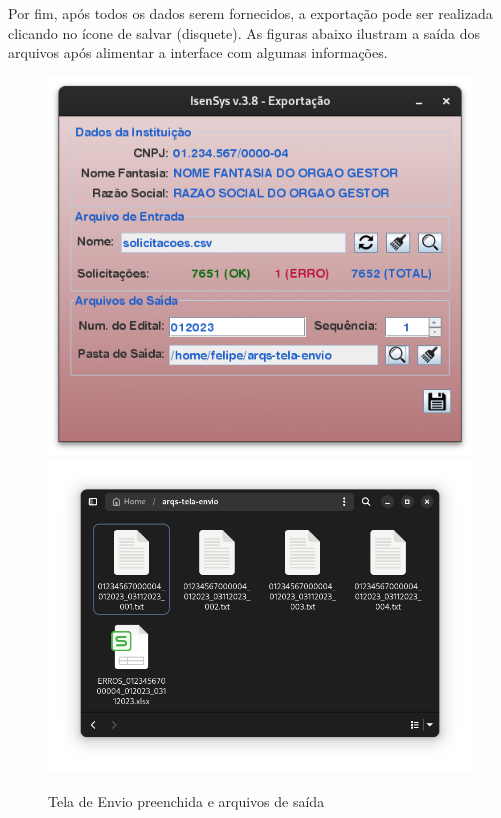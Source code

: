 \documentclass[
	12pt,			%
	openright,		%
	oneside,	
	a4paper,		%
	english,		%
	brazil			%
]{abntex2/abntex2}  %
\begin{document}
	Por fim, após todos os dados serem fornecidos, a exportação pode ser realizada clicando no ícone de salvar (disquete). As figuras abaixo ilustram a saída dos arquivos após alimentar a interface com algumas informações.

	\begin{figure}[H]
		\begin{center}
			
			\caption{Tela de Envio preenchida e arquivos de saída}
			\label{envio-ui-processed}
			
			\includegraphics[scale=0.4]{img/envio-ui-processed}
			\includegraphics[scale=0.3]{img/envio-files}
			
			
		\end{center}
	\end{figure}
\end{document}
